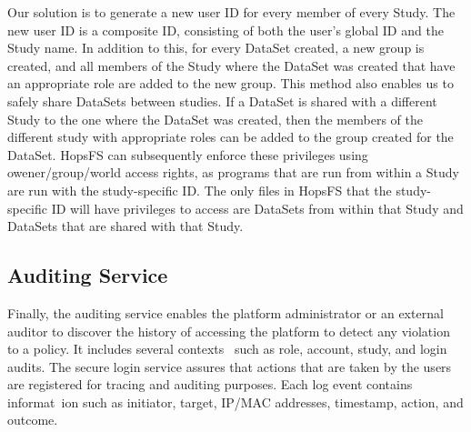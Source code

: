 
Our solution is to generate a new user ID for every member of every Study. The new user ID is a composite ID, consisting of both the user's global ID and the Study name. In addition to this, for every DataSet created, a new group is created, and all members of the Study where the DataSet was created that have an appropriate role are added to the new group. This method also enables us to safely share DataSets between studies. If a DataSet is shared with a different Study to the one where the DataSet was created, then the members of the different study with appropriate roles can be added to the group created for the DataSet. HopsFS can subsequently enforce these privileges using owener/group/world access rights, as programs that are run from within a Study are run with the study-specific ID. The only files in HopsFS that the study-specific ID will have privileges to access are DataSets from within that Study and DataSets that are shared with that Study. 




\subsection {Auditing Service}
Finally, the auditing service enables the platform administrator or an external auditor to discover the history of accessing the platform to detect any violation to a policy. It includes several contexts \
such as role, account, study, and login audits. The secure login service assures that actions that are taken by the users are registered for tracing and auditing purposes. Each log event contains informat\
ion such as initiator, target, IP/MAC addresses, timestamp, action, and outcome.
